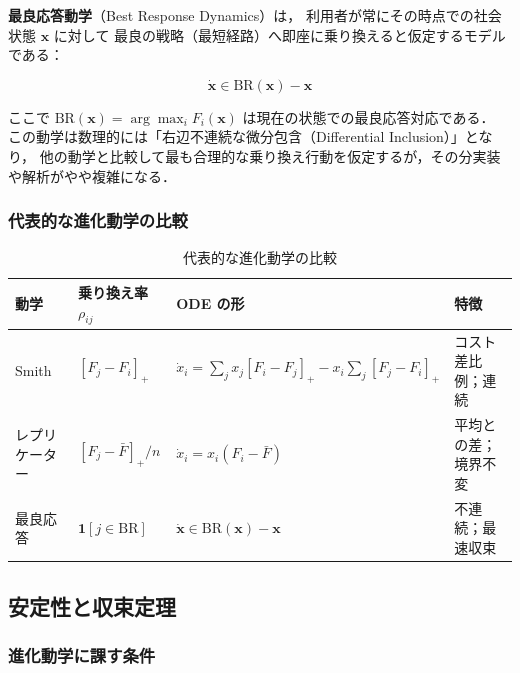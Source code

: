 \textbf{最良応答動学}（Best Response Dynamics）は，
利用者が常にその時点での社会状態 $\boldsymbol{x}$ に対して
最良の戦略（最短経路）へ即座に乗り換えると仮定するモデルである：

\begin{equation}
  \dot{\boldsymbol{x}} \in \mathrm{BR}(\boldsymbol{x}) - \boldsymbol{x}
  \label{eq:best-response}
\end{equation}

ここで $\mathrm{BR}(\boldsymbol{x}) = \arg\max_i F_i(\boldsymbol{x})$
は現在の状態での最良応答対応である．
この動学は数理的には「右辺不連続な微分包含（Differential Inclusion）」となり，
他の動学と比較して最も合理的な乗り換え行動を仮定するが，その分実装や解析がやや複雑になる．

\subsubsection*{代表的な進化動学の比較}

\begin{table}[hbtp]
  \centering
  \caption{代表的な進化動学の比較}
  \label{tab:dynamics-comparison}
  \begin{tabular}{llll}
    \toprule
    動学 & 乗り換え率 $\rho_{ij}$ & ODE の形 & 特徴 \\
    \midrule
    Smith & $[F_j - F_i]_+$ &
      $\dot{x}_i = \sum_j x_j[F_i\!-\!F_j]_+ - x_i\!\sum_j [F_j\!-\!F_i]_+$ &
      コスト差比例；連続 \\[2pt]
    レプリケーター & $[F_j - \bar{F}]_+/n$ &
      $\dot{x}_i = x_i(F_i - \bar{F})$ &
      平均との差；境界不変 \\[2pt]
    最良応答 & $\mathbf{1}[j \in \mathrm{BR}]$ &
      $\dot{\boldsymbol{x}} \in \mathrm{BR}(\boldsymbol{x}) - \boldsymbol{x}$ &
      不連続；最速収束 \\
    \bottomrule
  \end{tabular}
\end{table}

\subsection{安定性と収束定理}
\label{subsec:stability-convergence}

\subsubsection*{進化動学に課す条件}

